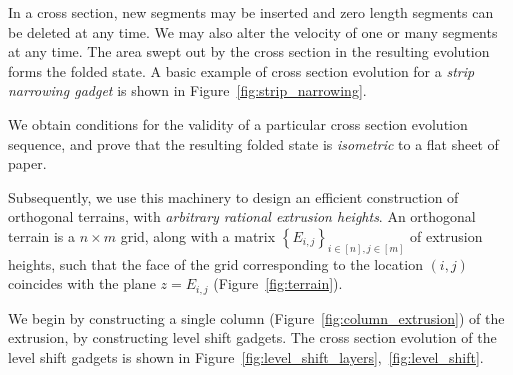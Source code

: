 In a cross section, new segments may be inserted and zero length segments can be deleted at any time.
We may also alter the velocity of one or many segments at any time.
The area swept out by the cross section in the resulting evolution forms the folded state.
A basic example of cross section evolution for a \emph{strip narrowing gadget} is shown in Figure~\ref{fig:strip_narrowing}.

\begin{figure}
    \vspace{-3.0em}
    \vspace{-0.7em}
    \graphicspath{{../figures/}}
    \def\svgwidth{0.3\textwidth}
    \vspace{-5.8em}
\end{figure}
We obtain conditions for the validity of a particular cross section evolution sequence,
and prove that the resulting folded state is \emph{isometric} to a flat sheet of paper.

Subsequently, we use this machinery to design an efficient construction of orthogonal terrains, with \emph{arbitrary rational extrusion heights}.
An orthogonal terrain is a $n\times m$ grid, along with a matrix $\left\{ E_{i,j}\right\}_{i\in [n], j\in[m]}$ of extrusion heights,
such that the face of the grid corresponding to the location $(i,j)$ coincides with the plane $z = E_{i,j}$ (Figure~\ref{fig:terrain}).

We begin by constructing a single column (Figure~\ref{fig:column_extrusion}) of the extrusion, by constructing level shift gadgets.
The cross section evolution of the level shift gadgets is shown in Figure~\ref{fig:level_shift_layers},~\ref{fig:level_shift}.

